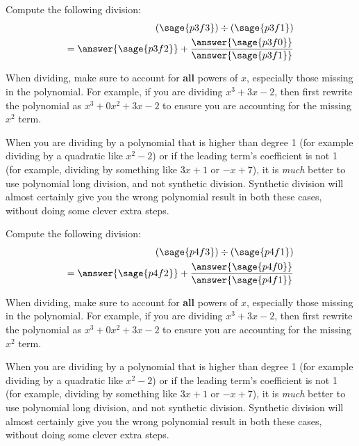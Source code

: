 \documentclass{ximera}
\begin{document}
\begin{problem}
    
    Compute the following division:
    \begin{align*}
        \left(\sage{p3f3}\right) \div \left(\sage{p3f1}\right) \\
        = \answer{\sage{p3f2}} + \frac{\answer{\sage{p3f0}}}{\answer{\sage{p3f1}}}
    \end{align*}
    \begin{feedback}
        When dividing, make sure to account for \textbf{all} powers of $x$, especially those missing in the polynomial. For example, if you are dividing $x^3 + 3x - 2$, then first rewrite the polynomial as $x^3 + 0x^2 + 3x - 2$ to ensure you are accounting for the missing $x^2$ term.
        
        When you are dividing by a polynomial that is higher than degree 1 (for example dividing by a quadratic like $x^2 -2$) or if the leading term's coefficient is not 1 (for example, dividing by something like $3x+1$ or $-x + 7$), it is \textit{much} better to use polynomial long division, and not synthetic division. Synthetic division will almost certainly give you the wrong polynomial result in both these cases, without doing some clever extra steps.
    \end{feedback}
    
\end{problem}

\begin{problem}
    
    Compute the following division:
    \begin{align*}
        \left(\sage{p4f3}\right) \div \left(\sage{p4f1}\right) \\
        = \answer{\sage{p4f2}} + \frac{\answer{\sage{p4f0}}}{\answer{\sage{p4f1}}}
    \end{align*}
    \begin{feedback}
        When dividing, make sure to account for \textbf{all} powers of $x$, especially those missing in the polynomial. For example, if you are dividing $x^3 + 3x - 2$, then first rewrite the polynomial as $x^3 + 0x^2 + 3x - 2$ to ensure you are accounting for the missing $x^2$ term.
        
        When you are dividing by a polynomial that is higher than degree 1 (for example dividing by a quadratic like $x^2 -2$) or if the leading term's coefficient is not 1 (for example, dividing by something like $3x+1$ or $-x + 7$), it is \textit{much} better to use polynomial long division, and not synthetic division. Synthetic division will almost certainly give you the wrong polynomial result in both these cases, without doing some clever extra steps.
    \end{feedback}
    
\end{problem}
\end{document}
